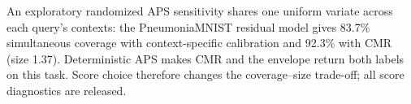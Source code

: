 An exploratory randomized APS sensitivity \cite{aps} shares one uniform variate across each query's contexts: the PneumoniaMNIST residual model gives 83.7\% simultaneous coverage with context-specific calibration and 92.3\% with CMR (size 1.37). Deterministic APS makes CMR and the envelope return both labels on this task. Score choice therefore changes the coverage--size trade-off; all score diagnostics are released.